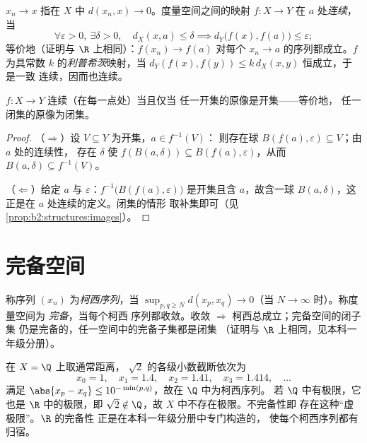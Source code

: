 \begin{definition}[极限与连续]\label{def:b2:metric:continuity}
$x_n \to x$ 指在 $X$ 中 $d(x_n, x) \to 0$。度量空间之间的映射 $f \colon X \to Y$
在 $a$ 处\emph{连续}，当
\[
\forall \varepsilon > 0,\ \exists\delta > 0,\quad
d_X(x, a) \leq \delta \implies d_Y\bigl(f(x), f(a)\bigr) \leq
\varepsilon ;
\]
等价地（证明与 $\R$ 上相同）：$f(x_n) \to f(a)$ 对每个
$x_n \to a$ 的序列都成立。$f$ 为具常数 $k$ 的\emph{利普希茨}映射，当
$d_Y(f(x), f(y)) \leq k\, d_X(x, y)$ 恒成立，于是一致
连续，因而也连续。
\end{definition}

\begin{theorem}[连续性的整体刻画]\label{thm:b2:metric:globalcontinuity}
$f \colon X \to Y$ 连续（在每一点处）当且仅当
任一开集的原像是开集——等价地，
任一闭集的原像为闭集。
\end{theorem}

\begin{proof}
（$\Rightarrow$）设 $V \subseteq Y$ 为开集，$a \in f^{-1}(V)$：
则存在球 $B(f(a), \varepsilon) \subseteq V$；由 $a$ 处的连续性，
存在 $\delta$ 使 $f(B(a, \delta)) \subseteq B(f(a),
\varepsilon)$，从而 $B(a, \delta) \subseteq f^{-1}(V)$。

（$\Leftarrow$）给定 $a$ 与 $\varepsilon$：$f^{-1}\bigl(B(f(a),
\varepsilon)\bigr)$ 是开集且含 $a$，故含一球
$B(a, \delta)$，这正是在 $a$ 处连续的定义。闭集的情形
取补集即可（见\cref{prop:b2:structures:images}）。
\end{proof}

\section{完备空间}

\begin{definition}\label{def:b2:metric:complete}
称序列 $(x_n)$ 为\emph{柯西序列}，当 $\sup_{p, q \geq N} d(x_p,
x_q) \to 0$（当 $N \to \infty$ 时）。称度量空间为
\emph{完备}，当每个柯西
序列都收敛。收敛 $\Rightarrow$ 柯西总成立；完备空间的闭子集
仍是完备的，任一空间中的完备子集都是闭集
（证明与 $\R$ 上相同，见本科一年级分册）。
\end{definition}

\begin{example}[无极限的柯西序列]\label{ex:b2:metric:cauchynolimit}
在 $X = \Q$ 上取通常距离，
$\sqrt2$ 的各级小数截断依次为
\[
x_0 = 1,\quad x_1 = 1.4,\quad x_2 = 1.41,\quad x_3 = 1.414,
\quad\dots
\]
满足 $\abs{x_p - x_q} \leq 10^{-\min(p,q)}$，故在 $\Q$ 中为柯西序列。
若 $\Q$ 中有极限，它也是 $\R$ 中的极限，即
$\sqrt2 \notin \Q$，故 $X$ 中不存在极限。不完备性即
存在这种“虚极限”。$\R$ 的完备性
正是在本科一年级分册中专门构造的，
使每个柯西序列都有归宿。
\end{example}

